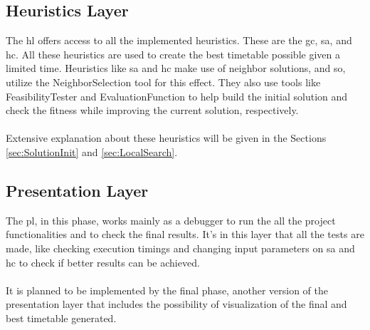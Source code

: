 \subsection{Heuristics Layer}

The \gls{hl} offers access to all the implemented heuristics. These are the \gls{gc}, \gls{sa}, and \gls{hc}. All these heuristics are used to create the best timetable possible given a limited time. Heuristics like \gls{sa} and \gls{hc} make use of neighbor solutions, and so, utilize the NeighborSelection tool for this effect. They also use tools like FeasibilityTester and EvaluationFunction to help build the initial solution and check the fitness while improving the current solution, respectively.\\
\\
Extensive explanation about these heuristics will be given in the Sections \ref{sec:SolutionInit} and \ref{sec:LocalSearch}.

\subsection{Presentation Layer}

The \gls{pl}, in this phase, works mainly as a debugger to run the all the project functionalities and to check the final results. It's in this layer that all the tests are made, like checking execution timings and changing input parameters on \gls{sa} and \gls{hc} to check if better results can be achieved.\\
\\
It is planned to be implemented by the final phase, another version of the presentation layer that includes the possibility of visualization of the final and best timetable generated.













